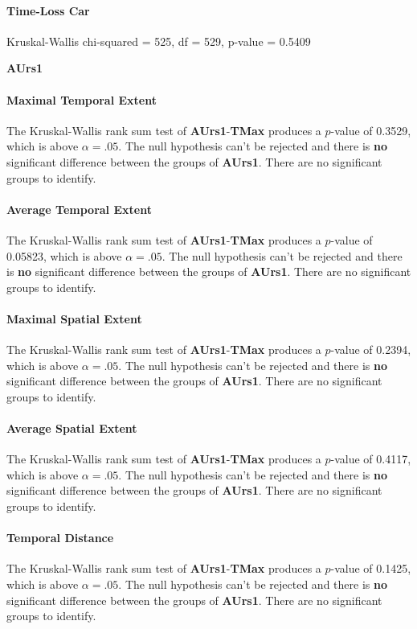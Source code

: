 \paragraph{Time-Loss Car}
Kruskal-Wallis chi-squared = 525, df = 529, p-value = 0.5409

\Large
\centerline{\textbf{AUrs1}}
\normalsize

\paragraph{Maximal Temporal Extent}
The Kruskal-Wallis rank sum test of \textbf{AUrs1}-\textbf{TMax} produces a $p$-value of 0.3529, which is above $\alpha=.05$. The null hypothesis can't be rejected and there is \textbf{no} significant difference between the groups of \textbf{AUrs1}. There are no significant groups to identify.
\paragraph{Average Temporal Extent}
The Kruskal-Wallis rank sum test of \textbf{AUrs1}-\textbf{TMax} produces a $p$-value of 0.05823, which is above $\alpha=.05$. The null hypothesis can't be rejected and there is \textbf{no} significant difference between the groups of \textbf{AUrs1}. There are no significant groups to identify.
\paragraph{Maximal Spatial Extent}
The Kruskal-Wallis rank sum test of \textbf{AUrs1}-\textbf{TMax} produces a $p$-value of 0.2394, which is above $\alpha=.05$. The null hypothesis can't be rejected and there is \textbf{no} significant difference between the groups of \textbf{AUrs1}. There are no significant groups to identify.
\paragraph{Average Spatial Extent}
The Kruskal-Wallis rank sum test of \textbf{AUrs1}-\textbf{TMax} produces a $p$-value of 0.4117, which is above $\alpha=.05$. The null hypothesis can't be rejected and there is \textbf{no} significant difference between the groups of \textbf{AUrs1}. There are no significant groups to identify.
\paragraph{Temporal Distance}
The Kruskal-Wallis rank sum test of \textbf{AUrs1}-\textbf{TMax} produces a $p$-value of 0.1425, which is above $\alpha=.05$. The null hypothesis can't be rejected and there is \textbf{no} significant difference between the groups of \textbf{AUrs1}. There are no significant groups to identify.
